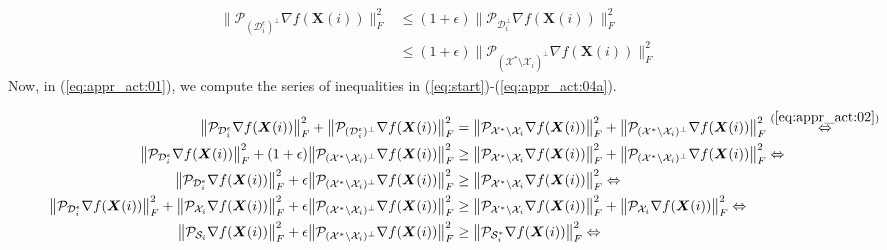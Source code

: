 \documentclass[twocolumn]{svjour3}
\newcommand{\vectornormbig}[1]{\big\|#1\big\|}
\newcommand{\signal}{\boldsymbol{X}}
\begin{document}
\begin{align}
\vectornormbig{\mathcal{P}_{(\mathcal{D}_i^\epsilon)^{\bot}} \nabla f(\signal(i))}_F^2 &\leq (1+\epsilon)\vectornormbig{\mathcal{P}_{\mathcal{D}_i^\bot} \nabla f(\signal(i))}_F^2 \nonumber \\ &\leq (1+\epsilon)\vectornormbig{\mathcal{P}_{(\mathcal{X}^\ast\setminus \mathcal{X}_i)^\bot} \nabla f(\signal(i))}_F^2 \label{eq:appr_act:03}
\end{align} Now, in (\ref{eq:appr_act:01}), we compute the series of inequalities in (\ref{eq:start})-(\ref{eq:appr_act:04a}).
\begin{figure*}[!htp]
\begin{align}
\vectornormbig{\mathcal{P}_{\mathcal{D}_i^\epsilon} \nabla f(\signal(i))}_F^2 + \vectornormbig{\mathcal{P}_{(\mathcal{D}_i^\epsilon)^{\bot}} \nabla f(\signal(i))}_F^2 &= \vectornormbig{\mathcal{P}_{\mathcal{X}^\ast\setminus \mathcal{X}_i} \nabla f(\signal(i))}_F^2 + \vectornormbig{\mathcal{P}_{(\mathcal{X}^\ast\setminus \mathcal{X}_i)^{\bot}} \nabla f(\signal(i))}_F^2 \stackrel{(\ref{eq:appr_act:02})}{\Leftrightarrow} \label{eq:start}\\
\vectornormbig{\mathcal{P}_{\mathcal{D}_i^\epsilon} \nabla f(\signal(i))}_F^2 + (1+\epsilon)\vectornormbig{\mathcal{P}_{(\mathcal{X}^\ast\setminus \mathcal{X}_i)^\bot} \nabla f(\signal(i))}_F^2 &\geq \vectornormbig{\mathcal{P}_{\mathcal{X}^\ast\setminus \mathcal{X}_i} \nabla f(\signal(i))}_F^2 + \vectornormbig{\mathcal{P}_{(\mathcal{X}^\ast\setminus \mathcal{X}_i)^{\bot}} \nabla f(\signal(i))}_F^2 \Leftrightarrow \nonumber \\
\vectornormbig{\mathcal{P}_{\mathcal{D}_i^\epsilon} \nabla f(\signal(i))}_F^2 + \epsilon\vectornormbig{\mathcal{P}_{(\mathcal{X}^\ast\setminus \mathcal{X}_i)^\bot} \nabla f(\signal(i))}_F^2 &\geq \vectornormbig{\mathcal{P}_{\mathcal{X}^\ast\setminus \mathcal{X}_i} \nabla f(\signal(i))}_F^2 \Leftrightarrow \nonumber \\
\vectornormbig{\mathcal{P}_{\mathcal{D}_i^\epsilon} \nabla f(\signal(i))}_F^2 + \vectornormbig{\mathcal{P}_{\mathcal{X}_i} \nabla f(\signal(i))}_F^2 + \epsilon\vectornormbig{\mathcal{P}_{(\mathcal{X}^\ast\setminus \mathcal{X}_i)^\bot} \nabla f(\signal(i))}_F^2 &\geq \vectornormbig{\mathcal{P}_{\mathcal{X}^\ast\setminus \mathcal{X}_i} \nabla f(\signal(i))}_F^2 + \vectornormbig{\mathcal{P}_{\mathcal{X}_i} \nabla f(\signal(i))}_F^2 \Leftrightarrow \nonumber \\
\vectornormbig{\mathcal{P}_{\mathcal{S}_i} \nabla f(\signal(i))}_F^2 + \epsilon\vectornormbig{\mathcal{P}_{(\mathcal{X}^\ast\setminus \mathcal{X}_i)^\bot} \nabla f(\signal(i))}_F^2 &\geq \vectornormbig{\mathcal{P}_{\mathcal{S}_i^\ast} \nabla f(\signal(i))}_F^2 \Leftrightarrow \nonumber \\

\end{align}
\end{figure*}
\end{document}
